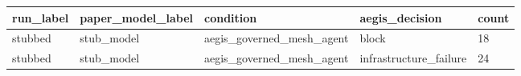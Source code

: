 \begin{tabular}{lllll}
 \hline
run\_label & paper\_model\_label & condition & aegis\_decision & count \\
 \hline
stubbed & stub\_model & aegis\_governed\_mesh\_agent & block & 18 \\
stubbed & stub\_model & aegis\_governed\_mesh\_agent & infrastructure\_failure & 24 \\
 \hline
\end{tabular}
